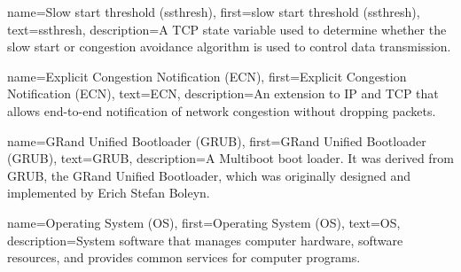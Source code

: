 {
    name={Slow start threshold (ssthresh)},
    first={slow start threshold (ssthresh)},
    text={ssthresh},
    description={A TCP state variable used to determine whether the slow start or congestion avoidance algorithm is used to control data transmission.}
}

{
    name={Explicit Congestion Notification (ECN)},
    first={Explicit Congestion Notification (ECN)},
    text={ECN},
    description={An extension to IP and TCP that allows end-to-end notification of network congestion without dropping packets.}
}

{
    name={GRand Unified Bootloader (GRUB)},
    first={GRand Unified Bootloader (GRUB)},
    text={GRUB},
    description={A Multiboot boot loader. It was derived from GRUB, the GRand Unified Bootloader, which was originally designed and implemented by Erich Stefan Boleyn.}
}

{
    name={Operating System (OS)},
    first={Operating System (OS)},
    text={OS},
    description={System software that manages computer hardware, software resources, and provides common services for computer programs.}
}